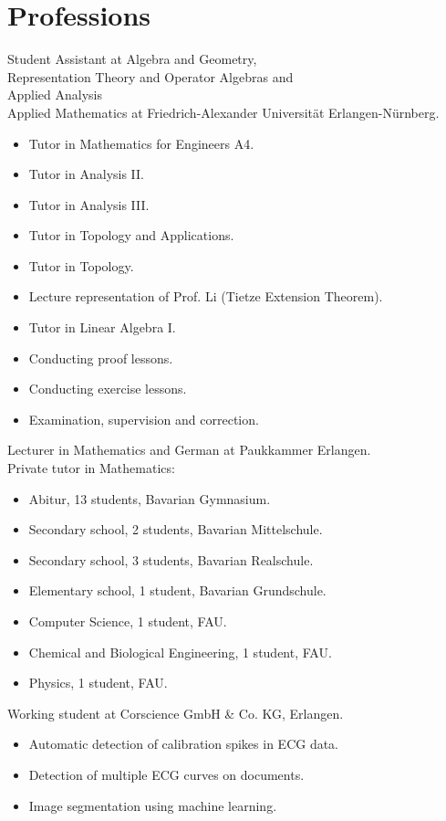 \documentclass[a4paper, 11pt]{article}
\newcommand{\years}[1]{\marginnote{\scriptsize #1}}
\begin{document}
\section*{Professions}
\years{2023--25} Student Assistant at Algebra and Geometry, \\
Representation Theory and Operator Algebras and \\
Applied Analysis \\
Applied Mathematics at Friedrich-Alexander Universität Erlangen-Nürnberg.
\begin{itemize}
	\item Tutor in \glqq Mathematics for Engineers A4\grqq.
	\item Tutor in \glqq Analysis II\grqq.
	\item Tutor in \glqq Analysis III\grqq.
	\item Tutor in \glqq Topology and Applications\grqq.
	\item Tutor in \glqq Topology\grqq.
	\item Lecture representation of Prof. Li (Tietze Extension Theorem).
	\item Tutor in \glqq Linear Algebra I\grqq.
	\item Conducting proof lessons.
	\item Conducting exercise lessons.
	\item Examination, supervision and correction.
\end{itemize}
\years{2025} Lecturer in Mathematics and German at Paukkammer Erlangen.\\
\years{2024--25} Private tutor in Mathematics:
\begin{itemize}
	\item Abitur, 13 students, Bavarian Gymnasium.
	\item Secondary school, 2 students, Bavarian Mittelschule.
	\item Secondary school, 3 students, Bavarian Realschule.
	\item Elementary school, 1 student, Bavarian Grundschule.
	\item Computer Science, 1 student, FAU. 
	\item Chemical and Biological Engineering, 1 student, FAU. 
	\item Physics, 1 student, FAU. 
\end{itemize}
\years{2021--22} Working student at Corscience GmbH \& Co. KG, Erlangen.
\begin{itemize}
	\item Automatic detection of calibration spikes in ECG data.
	\item Detection of multiple ECG curves on documents.
	\item Image segmentation using machine learning.
\end{itemize}
\end{document}
